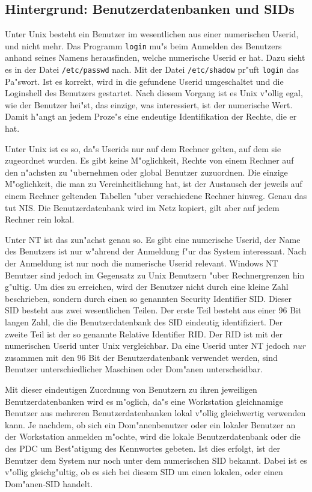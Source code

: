 \documentclass{scrartcl}\usepackage{pslatex}\typearea{12}
\newcommand{\prog}{\texttt}
\newcommand{\dateistyle}{\texttt}
\begin{document}
\subsection{Hintergrund: Benutzerdatenbanken und SIDs}

Unter Unix besteht ein Benutzer im wesentlichen aus einer numerischen
Userid, und nicht mehr. Das Programm \prog{login} mu"s beim Anmelden
des Benutzers anhand seines Namens herausfinden, welche numerische
Userid er hat. Dazu sieht es in der Datei \dateistyle{/etc/passwd}
nach.  Mit der Datei \dateistyle{/etc/shadow} pr"uft \prog{login} das
Pa"swort.  Ist es korrekt, wird in die gefundene Userid umgeschaltet
und die Loginshell des Benutzers gestartet.  Nach diesem Vorgang ist
es Unix v"ollig egal, wie der Benutzer hei"st, das einzige, was
interessiert, ist der numerische Wert. Damit h"angt an jedem Proze"s
eine endeutige Identifikation der Rechte, die er hat.

Unter Unix ist es so, da"s Userids nur auf dem Rechner gelten, auf dem
sie zugeordnet wurden. Es gibt keine M"oglichkeit, Rechte von einem
Rechner auf den n"achsten zu "ubernehmen oder global Benutzer
zuzuordnen. Die einzige M"oglichkeit, die man zu Vereinheitlichung
hat, ist der Austausch der jeweils auf einem Rechner geltenden
Tabellen "uber verschiedene Rechner hinweg. Genau das tut NIS. Die
Benutzerdatenbank wird im Netz kopiert, gilt aber
auf jedem Rechner rein lokal.

Unter NT ist das zun"achst genau so. Es gibt eine numerische Userid,
der Name des Benutzers ist nur w"ahrend der Anmeldung f"ur das System
interessant. Nach der Anmeldung ist nur noch die numerische Userid
relevant. Windows NT Benutzer sind jedoch im Gegensatz zu Unix
Benutzern "uber Rechnergrenzen hin g"ultig. Um dies zu erreichen, wird
der Benutzer nicht durch eine kleine Zahl beschrieben, sondern durch
einen so genannten Security Identifier SID. Dieser SID besteht aus zwei
wesentlichen Teilen. Der erste Teil besteht aus einer 96 Bit langen
Zahl, die die Benutzerdatenbank des SID eindeutig identifiziert. Der
zweite Teil ist der so genannte Relative Identifier RID. Der RID ist
mit der numerischen Userid unter Unix vergleichbar. Da eine Userid
unter NT jedoch \emph{nur} zusammen mit den 96 Bit der
Benutzerdatenbank verwendet werden, sind Benutzer unterschiedlicher
Maschinen oder Dom"anen unterscheidbar.

Mit dieser eindeutigen Zuordnung von Benutzern zu ihren jeweiligen
Benutzerdatenbanken wird es m"oglich, da"s eine Workstation
gleichnamige Benutzer aus mehreren Benutzerdatenbanken lokal v"ollig
gleichwertig verwenden kann. Je nachdem, ob sich ein Dom"anenbenutzer
oder ein lokaler Benutzer an der Workstation anmelden m"ochte, wird
die lokale Benutzerdatenbank oder die des PDC um Best"atigung des
Kennwortes gebeten. Ist dies erfolgt, ist der Benutzer dem System nur
noch unter dem numerischen SID bekannt. Dabei ist es v"ollig
gleichg"ultig, ob es sich bei diesem SID um einen lokalen, oder einen
Dom"anen-SID handelt.
\end{document}
